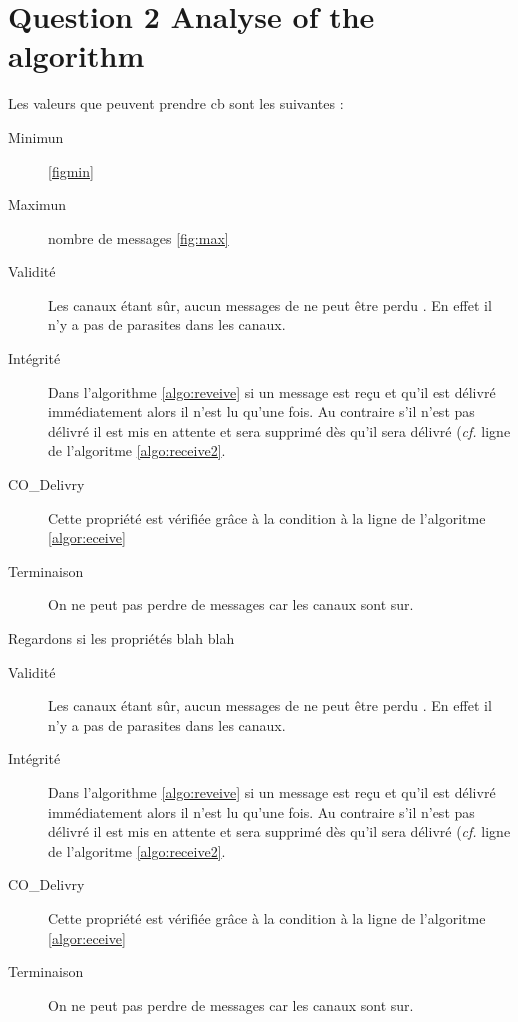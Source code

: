 \section{Question 2 Analyse of the algorithm}

Les valeurs que peuvent prendre cb sont les suivantes :

\begin{description}
\item[Minimun]
\ref{figmin}
\item[Maximun]
nombre de messages
\ref{fig:max}
\end{description}




\begin{description}
\item[Validité] Les canaux étant sûr, aucun messages de ne peut être \og perdu \fg{}. En effet il n'y a pas de parasites dans les canaux.
\item[Intégrité] Dans l'algorithme \ref{algo:reveive} si un message est reçu et qu'il est délivré immédiatement alors il n'est lu qu'une fois. Au contraire s'il n'est pas délivré il est mis en attente et sera supprimé dès qu'il sera délivré (\emph{cf.} ligne  de l'algoritme \ref{algo:receive2}.
\item[CO\_Delivry] Cette propriété est vérifiée grâce à la condition à la ligne de l'algoritme \ref{algor:eceive}
\item[Terminaison] On ne peut pas perdre de messages car les canaux sont sur. 
\end{description}



Regardons si les propriétés blah blah

\begin{description}
\item[Validité] Les canaux étant sûr, aucun messages de ne peut être \og perdu \fg{}. En effet il n'y a pas de parasites dans les canaux.
\item[Intégrité] Dans l'algorithme \ref{algo:reveive} si un message est reçu et qu'il est délivré immédiatement alors il n'est lu qu'une fois. Au contraire s'il n'est pas délivré il est mis en attente et sera supprimé dès qu'il sera délivré (\emph{cf.} ligne de l'algoritme \ref{algo:receive2}.
\item[CO\_Delivry] Cette propriété est vérifiée grâce à la condition à la ligne de l'algoritme \ref{algor:eceive}
\item[Terminaison] On ne peut pas perdre de messages car les canaux sont sur.
\end{description}

